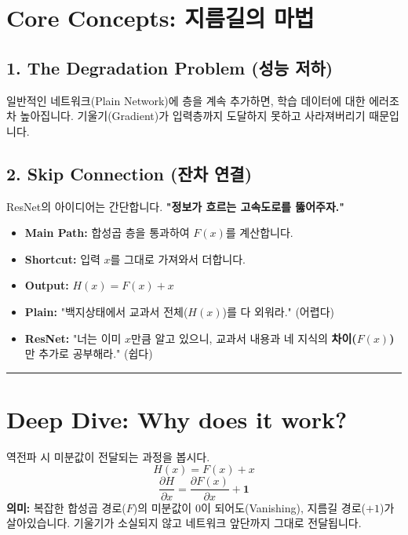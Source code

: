 \documentclass[11pt,a4paper]{book}
\theoremstyle{definition}
\begin{document}
\section{Core Concepts: 지름길의 마법}

\subsection{1. The Degradation Problem (성능 저하)}

일반적인 네트워크(Plain Network)에 층을 계속 추가하면, 학습 데이터에 대한 에러조차 높아집니다. 기울기(Gradient)가 입력층까지 도달하지 못하고 사라져버리기 때문입니다.

\subsection{2. Skip Connection (잔차 연결)}


ResNet의 아이디어는 간단합니다. \textbf{"정보가 흐르는 고속도로를 뚫어주자."}
\begin{itemize}
    \item \textbf{Main Path:} 합성곱 층을 통과하여 $F(x)$를 계산합니다.
    \item \textbf{Shortcut:} 입력 $x$를 그대로 가져와서 더합니다.
    \item \textbf{Output:} $H(x) = F(x) + x$
\end{itemize}

\begin{analogybox}[title={교과서 암기 비유}]
\begin{itemize}
    \item \textbf{Plain:} "백지상태에서 교과서 전체($H(x)$)를 다 외워라." (어렵다)
    \item \textbf{ResNet:} "너는 이미 $x$만큼 알고 있으니, 교과서 내용과 네 지식의 \textbf{차이($F(x)$)}만 추가로 공부해라." (쉽다)
\end{itemize}
\end{analogybox}

\vspace{0.5cm}\hrule\vspace{0.5cm}

\section{Deep Dive: Why does it work?}

\begin{mathbox}[title={Gradient Superhighway}]
역전파 시 미분값이 전달되는 과정을 봅시다.
$$ H(x) = F(x) + x $$
$$ \frac{\partial H}{\partial x} = \frac{\partial F(x)}{\partial x} + \mathbf{1} $$
\textbf{의미:} 복잡한 합성곱 경로($F$)의 미분값이 0이 되어도(Vanishing), 지름길 경로($+1$)가 살아있습니다. 기울기가 소실되지 않고 네트워크 앞단까지 그대로 전달됩니다.
\end{mathbox}
\end{document}

